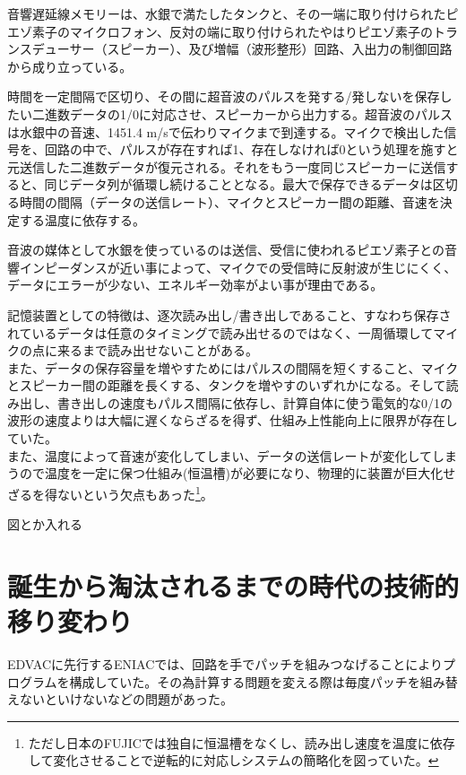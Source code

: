 音響遅延線メモリーは、水銀で満たしたタンクと、その一端に取り付けられたピエゾ素子のマイクロフォン、反対の端に取り付けられたやはりピエゾ素子のトランスデューサー（スピーカー）、及び増幅（波形整形）回路、入出力の制御回路から成り立っている。

時間を一定間隔で区切り、その間に超音波のパルスを発する/発しないを保存したい二進数データの1/0に対応させ、スピーカーから出力する。超音波のパルスは水銀中の音速、1451.4
m/sで伝わりマイクまで到達する。マイクで検出した信号を、回路の中で、パルスが存在すれば1、存在しなければ0という処理を施すと元送信した二進数データが復元される。それをもう一度同じスピーカーに送信すると、同じデータ列が循環し続けることとなる。最大で保存できるデータは区切る時間の間隔（データの送信レート）、マイクとスピーカー間の距離、音速を決定する温度に依存する。

音波の媒体として水銀を使っているのは送信、受信に使われるピエゾ素子との音響インピーダンスが近い事によって、マイクでの受信時に反射波が生じにくく、データにエラーが少ない、エネルギー効率がよい事が理由である。

記憶装置としての特徴は、逐次読み出し/書き出しであること、すなわち保存されているデータは任意のタイミングで読み出せるのではなく、一周循環してマイクの点に来るまで読み出せないことがある。\\
また、データの保存容量を増やすためにはパルスの間隔を短くすること、マイクとスピーカー間の距離を長くする、タンクを増やすのいずれかになる。そして読み出し、書き出しの速度もパルス間隔に依存し、計算自体に使う電気的な0/1の波形の速度よりは大幅に遅くならざるを得ず、仕組み上性能向上に限界が存在していた。\\
また、温度によって音速が変化してしまい、データの送信レートが変化してしまうので温度を一定に保つ仕組み(恒温槽)が必要になり、物理的に装置が巨大化せざるを得ないという欠点もあった\footnote{ただし日本のFUJICでは独自に恒温槽をなくし、読み出し速度を温度に依存して変化させることで逆転的に対応しシステムの簡略化を図っていた。}。

図とか入れる

\section{誕生から淘汰されるまでの時代の技術的移り変わり}\label{ux8a95ux751fux304bux3089ux6dd8ux6c70ux3055ux308cux308bux307eux3067ux306eux6642ux4ee3ux306eux6280ux8853ux7684ux79fbux308aux5909ux308fux308a}

EDVACに先行するENIACでは、回路を手でパッチを組みつなげることによりプログラムを構成していた。その為計算する問題を変える際は毎度パッチを組み替えないといけないなどの問題があった。

